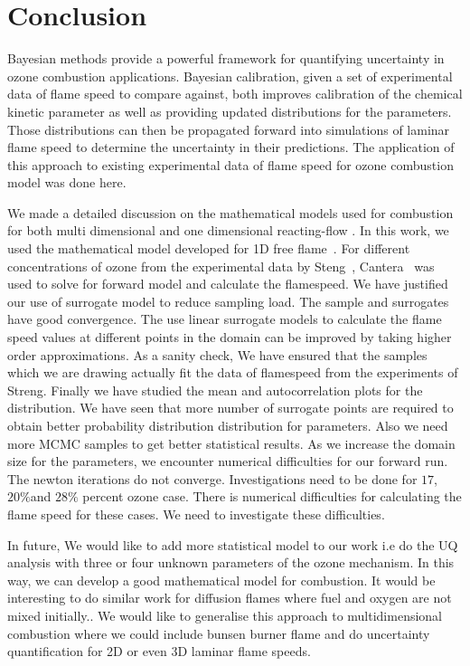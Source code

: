 
\chapter{Conclusion}\label{chap:conclusion}

Bayesian methods provide a powerful framework for quantifying uncertainty in ozone
combustion applications. Bayesian calibration, given a set of experimental data of flame speed to compare
against, both improves calibration of the chemical kinetic parameter as well as providing
updated distributions for the parameters. Those distributions can then be
propagated forward into simulations of laminar flame speed to determine the uncertainty in
their predictions. The application of this approach to existing experimental data of flame speed for ozone combustion model was done here.


We made a detailed discussion on the mathematical models used for combustion for both multi dimensional and one dimensional reacting-flow . In this work, we used the mathematical model developed for 1D free flame~\cite{Kuo}. For different concentrations of ozone from the experimental data by Steng~\cite{Streng}, Cantera~\cite{Cantera} was used to solve for forward model and calculate the flamespeed. We have justified our use of surrogate model to reduce  sampling load. The sample and surrogates have good convergence. The use linear surrogate models to calculate the flame speed values at different points in the domain can be improved by taking higher order approximations. As a sanity check, We have ensured that the samples which we are drawing actually fit the data of flamespeed from the experiments of Streng\cite{Streng}. Finally we have studied the mean and autocorrelation plots for the distribution. We have seen that more number of surrogate points are required to obtain better probability distribution distribution for parameters. Also we need more MCMC samples to get better statistical results. As we increase the domain size for the parameters, we encounter numerical difficulties for our forward run. The newton iterations do not converge. Investigations need to be done for $17$, $20 \% $and $ 28 \% $ percent ozone case. There is numerical difficulties for calculating the flame speed for these cases. We need to investigate these difficulties. 

In future, We would like to add more statistical model to our work i.e do the UQ analysis with three or four unknown parameters of the ozone mechanism. In this way, we can develop a good mathematical model for combustion. It would be interesting to do similar work for diffusion flames where fuel and oxygen are not mixed initially.. We would like to generalise this approach to multidimensional combustion where we could include bunsen burner flame and do uncertainty quantification for 2D or even 3D laminar flame speeds.  

